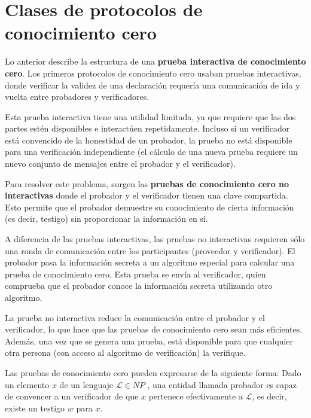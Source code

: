 \section{Clases de protocolos de conocimiento cero} \label{sec:clases}

Lo anterior describe la estructura de una \textbf{prueba interactiva de conocimiento cero}. Los primeros protocolos de conocimiento cero usaban pruebas interactivas, donde verificar la validez de una declaración requería una comunicación de ida y vuelta entre probadores y verificadores.

Esta prueba interactiva tiene una utilidad limitada, ya que requiere que las dos partes estén disponibles e interactúen repetidamente. Incluso si un verificador está convencido de la honestidad de un probador, la prueba no está disponible para una verificación independiente (el cálculo de una nueva prueba requiere un nuevo conjunto de mensajes entre el probador y el verificador).

Para resolver este problema, surgen las \textbf{pruebas de conocimiento cero no interactivas} donde el probador y el verificador tienen una clave compartida. Esto permite que el probador demuestre su conocimiento de cierta información (es decir, testigo) sin proporcionar la información en sí.

A diferencia de las pruebas interactivas, las pruebas no interactivas requieren sólo una ronda de comunicación entre los participantes (proveedor y verificador). El probador pasa la información secreta a un algoritmo especial para calcular una prueba de conocimiento cero. Esta prueba se envía al verificador, quien comprueba que el probador conoce la información secreta utilizando otro algoritmo.

La prueba no interactiva reduce la comunicación entre el probador y el verificador, lo que hace que las pruebas de conocimiento cero sean más eficientes. Además, una vez que se genera una prueba, está disponible para que cualquier otra persona (con acceso al algoritmo de verificación) la verifique.

Las pruebas de conocimiento cero pueden expresarse de la siguiente forma: Dado un elemento $x$ de un lenguaje $\mathcal{L} \in NP$ , una entidad llamada probador es capaz de convencer a un verificador de que $x$ pertenece efectivamente a $\mathcal{L}$, es decir, existe un testigo $w$ para $x$.

